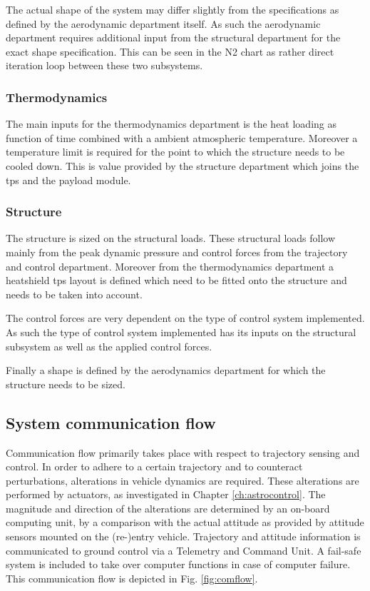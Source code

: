The actual shape of the system may differ slightly from the specifications as defined by the aerodynamic department itself. As such the aerodynamic department requires additional input from the structural department for the exact shape specification. This can be seen in the N2 chart as rather direct iteration loop between these two subsystems.

\subsubsection{Thermodynamics}
The main inputs for the thermodynamics department is the heat loading as function of time combined with a ambient atmospheric temperature. Moreover a temperature limit is required for the point to which the structure needs to be cooled down. This is value provided by the structure department which joins the \gls{tps} and the payload module.

\subsubsection{Structure}

The structure is sized on the structural loads. These structural loads follow mainly from the peak dynamic pressure and control forces from the trajectory and control department. Moreover from the thermodynamics department a heatshield \gls{tps} layout is defined which need to be fitted onto the structure and needs to be taken into account. 

The control forces are very dependent on the type of control system implemented. As such the type of control system implemented has its inputs on the structural subsystem as well as the applied control forces. 

Finally a shape is defined by the aerodynamics department for which the structure needs to be sized. 

\subsection{System communication flow} \label{sec:comflow}
Communication flow primarily takes place with respect to trajectory sensing and control. In order to adhere to a certain trajectory and to counteract perturbations, alterations in vehicle dynamics are required. These alterations are performed by actuators, as investigated in Chapter \ref{ch:astrocontrol}. The magnitude and direction of the alterations are determined by an on-board computing unit, by a comparison with the actual attitude as provided by attitude sensors mounted on the (re-)entry vehicle. Trajectory and attitude information is communicated to ground control via a Telemetry and Command Unit. A fail-safe system is included to take over computer functions in case of computer failure. This communication flow is depicted in Fig. \ref{fig:comflow}.

